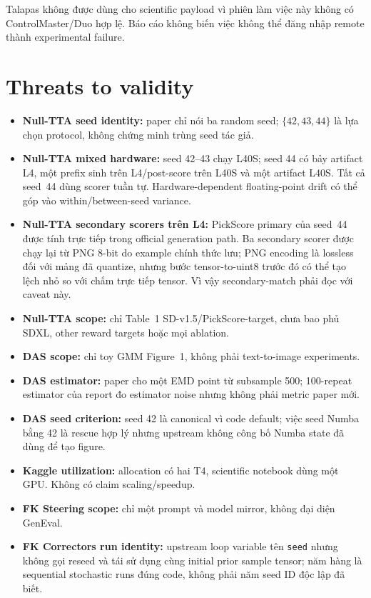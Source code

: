 \documentclass[11pt,a4paper]{article}
\newcommand{\code}[1]{\texttt{#1}}
\begin{document}
Talapas không được dùng cho scientific payload vì phiên làm việc này không có ControlMaster/Duo hợp lệ. Báo cáo không biến việc không thể đăng nhập remote thành experimental failure.

\section{Threats to validity}

\begin{itemize}
  \item \textbf{Null-TTA seed identity:} paper chỉ nói ba random seed; $\{42,43,44\}$ là lựa chọn protocol, không chứng minh trùng seed tác giả.
  \item \textbf{Null-TTA mixed hardware:} seed 42--43 chạy L40S; seed 44 có bảy artifact L4, một prefix sinh trên L4/post-score trên L40S và một artifact L40S. Tất cả seed~44 dùng scorer tuần tự. Hardware-dependent floating-point drift có thể góp vào within/between-seed variance.
  \item \textbf{Null-TTA secondary scorers trên L4:} PickScore primary của seed~44 được tính trực tiếp trong official generation path. Ba secondary scorer được chạy lại từ PNG 8-bit do example chính thức lưu; PNG encoding là lossless đối với mảng đã quantize, nhưng bước tensor-to-uint8 trước đó có thể tạo lệch nhỏ so với chấm trực tiếp tensor. Vì vậy secondary-match phải đọc với caveat này.
  \item \textbf{Null-TTA scope:} chỉ Table~1 SD-v1.5/PickScore-target, chưa bao phủ SDXL, other reward targets hoặc mọi ablation.
  \item \textbf{DAS scope:} chỉ toy GMM Figure~1, không phải text-to-image experiments.
  \item \textbf{DAS estimator:} paper cho một EMD point từ subsample 500; 100-repeat estimator của report đo estimator noise nhưng không phải metric paper mới.
  \item \textbf{DAS seed criterion:} seed 42 là canonical vì code default; việc seed Numba bằng 42 là rescue hợp lý nhưng upstream không công bố Numba state đã dùng để tạo figure.
  \item \textbf{Kaggle utilization:} allocation có hai T4, scientific notebook dùng một GPU. Không có claim scaling/speedup.
  \item \textbf{FK Steering scope:} chỉ một prompt và model mirror, không đại diện GenEval.
  \item \textbf{FK Correctors run identity:} upstream loop variable tên \code{seed} nhưng không gọi reseed và tái sử dụng cùng initial prior sample tensor; năm hàng là sequential stochastic runs đúng code, không phải năm seed ID độc lập đã biết.

\end{itemize}
\end{document}
